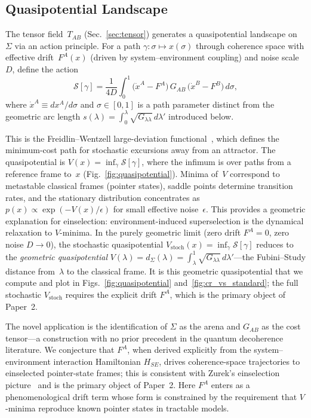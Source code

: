 \documentclass[aps,prd,twocolumn,superscriptaddress,nofootinbib,floatfix]{revtex4-2}
\newcommand{\Sig}{\Sigma}
\newcommand{\Tab}{T_{AB}}
\newcommand{\Gll}{G_{\lambda\lambda}}
\begin{document}
\subsection{Quasipotential Landscape}

The tensor field~$\Tab$ (Sec.~\ref{sec:tensor}) generates a quasipotential landscape on~$\Sig$ via an action principle. For a path $\gamma: \sigma \mapsto x(\sigma)$ through coherence space with effective drift~$F^A(x)$ (driven by system--environment coupling) and noise scale~$D$, define the action
\begin{equation}\label{eq:action}
\mathcal{S}[\gamma] = \frac{1}{4D}\int_0^1
  \bigl(\dot{x}^A - F^A\bigr)\,G_{AB}\,
  \bigl(\dot{x}^B - F^B\bigr)\,d\sigma,
\end{equation}
where $\dot{x}^A \equiv dx^A/d\sigma$ and $\sigma\in[0,1]$ is a path parameter distinct from the geometric arc length $s(\lambda) = \int_0^\lambda\!\sqrt{\Gll}\,d\lambda'$ introduced below.

This is the Freidlin--Wentzell large-deviation functional~\cite{FreidlinWentzell2012}, which defines the minimum-cost path for stochastic excursions away from an attractor.
The quasipotential is $V(x) = \inf_\gamma \mathcal{S}[\gamma]$, where the infimum is over paths from a reference frame to~$x$ (Fig.~\ref{fig:quasipotential}). Minima of~$V$ correspond to metastable classical frames (pointer states), saddle points determine transition rates, and the stationary distribution concentrates as $p(x) \propto \exp(-V(x)/\epsilon)$ for small effective noise~$\epsilon$. This provides a geometric explanation for einselection: environment-induced superselection is the dynamical relaxation to $V$-minima. In the purely geometric limit (zero drift $F^A = 0$, zero noise $D \to 0$), the stochastic quasipotential $V_{\mathrm{stoch}}(x) = \inf_\gamma \mathcal{S}[\gamma]$ reduces to the \emph{geometric quasipotential} $V(\lambda) = d_\Sig(\lambda) = \int_\lambda^1\!\sqrt{\Gll}\,d\lambda'$---the Fubini--Study distance from~$\lambda$ to the classical frame. It is this geometric quasipotential that we compute and plot in Figs.~\ref{fig:quasipotential} and~\ref{fig:cr_vs_standard}; the full stochastic $V_{\mathrm{stoch}}$ requires the explicit drift $F^A$, which is the primary object of Paper~2.

The novel application is the identification of $\Sig$ as the arena and $G_{AB}$ as the cost tensor---a construction with no prior precedent in the quantum decoherence literature. We conjecture that $F^A$, when derived explicitly from the system--environment interaction Hamiltonian $H_{SE}$, drives coherence-space trajectories to einselected pointer-state frames; this is consistent with Zurek's einselection picture~\cite{zurekDecoherenceEinselectionQuantum2003} and is the primary object of Paper~2. Here $F^A$ enters as a phenomenological drift term whose form is constrained by the requirement that $V$-minima reproduce known pointer states in tractable models.
\end{document}
